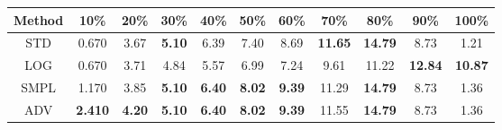 \documentclass{standalone}
\begin{document}
\begin{tabular}{c|cccccccccc}
      \toprule
      Method & 10\% & 20\% & 30\% & 40\% & 50\% & 60\% & 70\% & 80\% & 90\% & 100\% \\
      \midrule
STD & 0.670 & 3.67 & \textbf{5.10} & 6.39 & 7.40 & 8.69 & \textbf{11.65} & \textbf{14.79} & 8.73 & 1.21\\
LOG & 0.670 & 3.71 & 4.84 & 5.57 & 6.99 & 7.24 & 9.61 & 11.22 & \textbf{12.84} & \textbf{10.87}\\
SMPL & 1.170 & 3.85 & \textbf{5.10} & \textbf{6.40} & \textbf{8.02} & \textbf{9.39} & 11.29 & \textbf{14.79} & 8.73 & 1.36\\
ADV & \textbf{2.410} & \textbf{4.20} & \textbf{5.10} & \textbf{6.40} & \textbf{8.02} & \textbf{9.39} & 11.55 & \textbf{14.79} & 8.73 & 1.36\\
  \bottomrule
\end{tabular}
\end{document}
